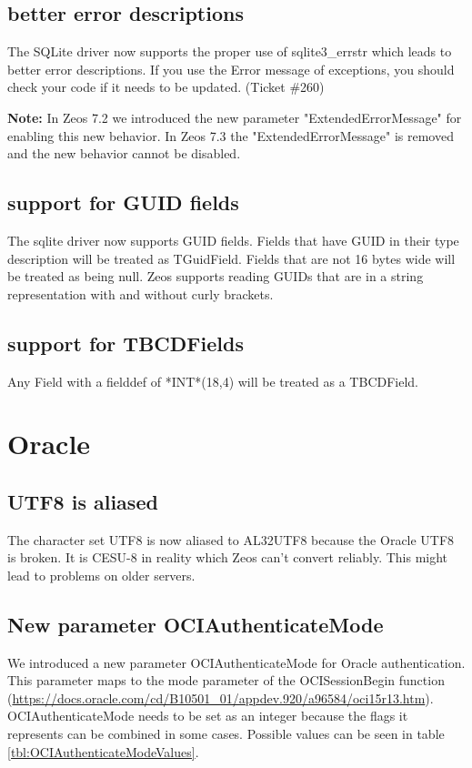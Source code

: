 \documentclass[a4paper,12pt,oneside]{article}
\begin{document}
\subsection{better error descriptions}
The SQLite driver now supports the proper use of sqlite3\_errstr which leads to better error descriptions.
If you use the Error message of exceptions, you should check your code if it needs to be updated. (Ticket \#260)

\textbf{Note:}
In Zeos 7.2 we introduced the new parameter "ExtendedErrorMessage" for enabling this new behavior.
In Zeos 7.3 the "ExtendedErrorMessage" is removed and the new behavior cannot be disabled.

\subsection{support for GUID fields}
The sqlite driver now supports GUID fields.
Fields that have GUID in their type description will be treated as TGuidField.
Fields that are not 16 bytes wide will be treated as being null.
Zeos supports reading GUIDs that are in a string representation with and without curly brackets.

\subsection{support for TBCDFields}
Any Field with a fielddef of *INT*(18,4) will be treated as a TBCDField.

\section{Oracle}

\subsection{UTF8 is aliased}
The character set UTF8 is now aliased to AL32UTF8 because the Oracle UTF8 is broken.
It is CESU-8 in reality which Zeos can't convert reliably.
This might lead to problems on older servers.

\subsection{New parameter OCIAuthenticateMode}
\FloatBarrier
We introduced a new parameter OCIAuthenticateMode for Oracle authentication.
This parameter maps to the mode parameter of the OCISessionBegin function (\url{https://docs.oracle.com/cd/B10501_01/appdev.920/a96584/oci15r13.htm}).
OCIAuthenticateMode needs to be set as an integer because the flags it represents can be combined in some cases.
Possible values can be seen in table \ref{tbl:OCIAuthenticateModeValues}.
\end{document}
